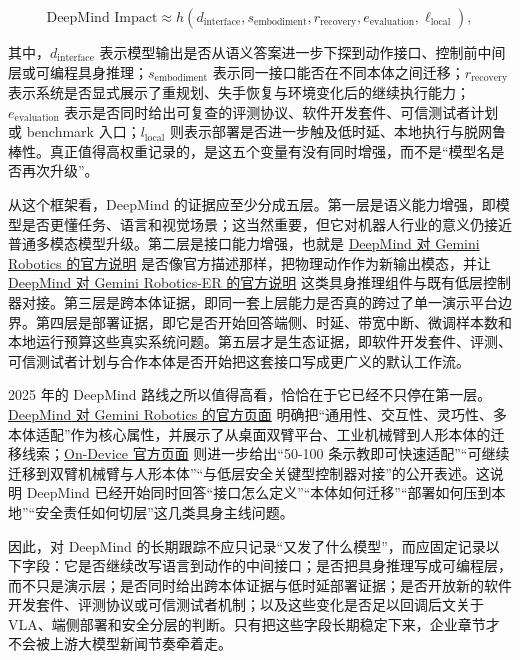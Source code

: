 \begingroup
\scriptsize
\begin{equation*}
\text{DeepMind Impact} \approx h(d_{\text{interface}}, s_{\text{embodiment}}, r_{\text{recovery}}, e_{\text{evaluation}}, \ell_{\text{local}}),
\end{equation*}
\endgroup

其中，\(d_{\text{interface}}\) 表示模型输出是否从语义答案进一步下探到动作接口、控制前中间层或可编程具身推理；\(s_{\text{embodiment}}\) 表示同一接口能否在不同本体之间迁移；\(r_{\text{recovery}}\) 表示系统是否显式展示了重规划、失手恢复与环境变化后的继续执行能力；\(e_{\text{evaluation}}\) 表示是否同时给出可复查的评测协议、软件开发套件、可信测试者计划或 benchmark 入口；\(l_{\text{local}}\) 则表示部署是否进一步触及低时延、本地执行与脱网鲁棒性。真正值得高权重记录的，是这五个变量有没有同时增强，而不是“模型名是否再次升级”。

从这个框架看，DeepMind 的证据应至少分成五层。第一层是语义能力增强，即模型是否更懂任务、语言和视觉场景；这当然重要，但它对机器人行业的意义仍接近普通多模态模型升级。第二层是接口能力增强，也就是 \href{https://deepmind.google/blog/gemini-robotics-brings-ai-into-the-physical-world/}{DeepMind 对 Gemini Robotics 的官方说明} 是否像官方描述那样，把物理动作作为新输出模态，并让 \href{https://deepmind.google/blog/gemini-robotics-brings-ai-into-the-physical-world/}{DeepMind 对 Gemini Robotics-ER 的官方说明} 这类具身推理组件与既有低层控制器对接。第三层是跨本体证据，即同一套上层能力是否真的跨过了单一演示平台边界。第四层是部署证据，即它是否开始回答端侧、时延、带宽中断、微调样本数和本地运行预算这些真实系统问题。第五层才是生态证据，即软件开发套件、评测、可信测试者计划与合作本体是否开始把这套接口写成更广义的默认工作流。

2025 年的 DeepMind 路线之所以值得高看，恰恰在于它已经不只停在第一层。\href{https://deepmind.google/blog/gemini-robotics-brings-ai-into-the-physical-world/}{DeepMind 对 Gemini Robotics 的官方页面} 明确把“通用性、交互性、灵巧性、多本体适配”作为核心属性，并展示了从桌面双臂平台、工业机械臂到人形本体的迁移线索；\href{https://deepmind.google/blog/gemini-robotics-on-device-brings-ai-to-local-robotic-devices/}{On-Device 官方页面} 则进一步给出“50-100 条示教即可快速适配”“可继续迁移到双臂机械臂与人形本体”“与低层安全关键型控制器对接”的公开表述。这说明 DeepMind 已经开始同时回答“接口怎么定义”“本体如何迁移”“部署如何压到本地”“安全责任如何切层”这几类具身主线问题。

因此，对 DeepMind 的长期跟踪不应只记录“又发了什么模型”，而应固定记录以下字段：它是否继续改写语言到动作的中间接口；是否把具身推理写成可编程层，而不只是演示层；是否同时给出跨本体证据与低时延部署证据；是否开放新的软件开发套件、评测协议或可信测试者机制；以及这些变化是否足以回调后文关于 VLA、端侧部署和安全分层的判断。只有把这些字段长期稳定下来，企业章节才不会被上游大模型新闻节奏牵着走。

